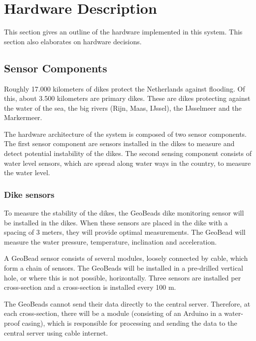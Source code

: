 \clearpage
\section{Hardware Description}
\label{sec:hardware-description}
This section gives an outline of the hardware implemented in this system. This section also elaborates on hardware decisions.

\subsection{Sensor Components}
\label{subsec:sensing-components}
Roughly 17.000 kilometers of dikes protect the Netherlands against flooding\cite{DMC}. Of this, about 3.500 kilometers are primary dikes\cite{waterwijzer}. These are dikes protecting against the water of the sea, the big rivers (Rijn, Maas, IJssel), the IJsselmeer and the Markermeer. 

The hardware architecture of the system is composed of two sensor components. The first sensor component are sensors installed in the dikes to measure and detect potential instability of the dikes.
The second sensing component consists of water level sensors, which are spread along water ways in the country, to measure the water level. 

\label{dikesensors}
\subsubsection*{Dike sensors}
To measure the stability of the dikes, the GeoBeads dike monitoring sensor will be installed in the dikes. When these sensors are placed in the dike with a spacing of 3 meters, they will provide optimal measurements\cite{ng180levee}. The GeoBead will measure the water pressure, temperature, inclination and acceleration.

A GeoBead sensor consists of several modules, loosely connected by cable, which form a chain of sensors. The GeoBeads will be installed in a pre-drilled vertical hole, or where this is not possible, horizontally. Three sensors are installed per cross-section and a cross-section is installed every 100 m. 

The GeoBeads cannot send their data directly to the central server. Therefore, at each cross-section, there will be a module (consisting of an Arduino in a water-proof casing), which is responsible for processing and sending the data to the central server using cable internet.

